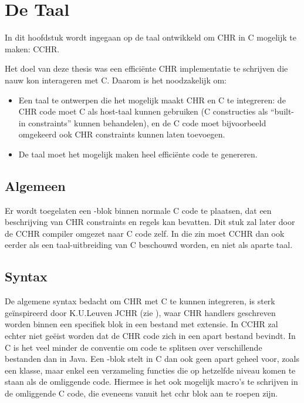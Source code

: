\chapter{De Taal} \label{chap:taal}

In dit hoofdstuk wordt ingegaan op de taal ontwikkeld om CHR in C mogelijk te maken: CCHR.

Het doel van deze thesis was een effici\"ente CHR implementatie te schrijven die nauw kon interageren met C. Daarom is het noodzakelijk om: \begin{itemize}
  \item Een taal te ontwerpen die het mogelijk maakt CHR en C te integreren: de CHR code moet C
        als host-taal kunnen gebruiken (C constructies als ``built-in constraints'' kunnen
	behandelen), en de C code moet bijvoorbeeld omgekeerd ook CHR constraints kunnen laten toevoegen.
  \item De taal moet het mogelijk maken heel effici\"ente code te genereren.
\end{itemize}

\section{Algemeen} \label{sec:taal-gen}

Er wordt toegelaten een -blok binnen normale C code te plaatsen, dat een beschrijving van CHR constraints en regels kan bevatten. Dit stuk zal later door de CCHR compiler omgezet naar C code zelf. In die zin moet CCHR dan ook eerder als een taal-uitbreiding van C beschouwd worden, en niet als aparte taal. 

\section{Syntax} \label{sec:taal-syn}

De algemene syntax bedacht om CHR met C te kunnen integreren, is sterk ge\"inspireerd door K.U.Leuven JCHR (zie \cite{peter:jchr}), waar CHR handlers geschreven worden binnen een specifiek blok in een bestand met  extensie. In CCHR zal echter niet ge\"eist worden dat de CHR code zich in een apart bestand bevindt. In C is het veel minder de conventie om code te splitsen over verschillende bestanden dan in Java. Een -blok stelt in C dan ook geen apart geheel voor, zoals een klasse, maar enkel een verzameling functies die op hetzelfde niveau komen te staan als de omliggende code. Hiermee is het ook mogelijk macro's te schrijven in de omliggende C code, die eveneens vanuit het cchr blok aan te roepen zijn.

